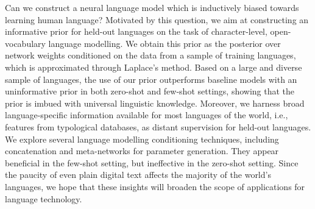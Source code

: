 Can we construct a neural language model which is inductively biased towards learning human language? Motivated by this question, we aim at constructing an informative prior for held-out languages on the task of character-level, open-vocabulary language modelling. We obtain this prior as the posterior over network weights conditioned on the data from a sample of training languages, which is approximated through Laplace's method. Based on a large and diverse sample of languages, the use of our prior outperforms baseline models with an uninformative prior in both zero-shot and few-shot settings, showing that the prior is imbued with universal linguistic knowledge. Moreover, we harness broad language-specific information available for most languages of the world, i.e., features from typological databases, as distant supervision for held-out languages. We explore several language modelling conditioning techniques, including concatenation and meta-networks for parameter generation. They appear beneficial in the few-shot setting, but ineffective in the zero-shot setting. Since the paucity of even plain digital text affects the majority of the world's languages, we hope that these insights will broaden the scope of applications for language technology.